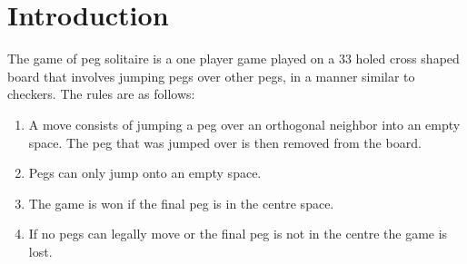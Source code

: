 \documentclass[10pt]{article}
\begin{document}
\section{Introduction}
The game of peg solitaire is a one player game played on a 33 holed cross shaped board that involves jumping pegs over other pegs, in a manner similar to checkers. The rules are as follows:
\begin{enumerate}
  \item A move consists of jumping a peg over an orthogonal neighbor into an empty space. The peg that was jumped over is then removed from the board.
  \item Pegs can only jump onto an empty space.
  \item The game is won if the final peg is in the centre space.
  \item If no pegs can legally move or the final peg is not in the centre the game is lost.
\end{enumerate}
\end{document}
